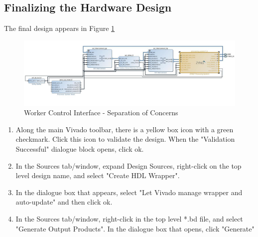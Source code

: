 \documentclass[12pt]{article}
\begin{document}
\subsection{Finalizing the Hardware Design}
The final design appears in Figure \ref{fig:hardware_design}
\begin{figure}[H]
  \begin{center}
  \includegraphics[scale=0.5]{figures/hardware_design.jpeg}
  \caption{Worker Control Interface - Separation of Concerns}  \label{fig:hardware_design}
  \end{center}
\end{figure}													
\begin{enumerate}
\item Along the main Vivado toolbar, there is a yellow box icon with a green checkmark.  Click this icon to validate the design. When the "Validation Successful" dialogue block opens, click ok. 
\item In the Sources tab/window, expand Design Sources, right-click on the top level design name, and select "Create HDL Wrapper".
\item In the dialogue box that appears, select "Let Vivado manage wrapper and auto-update" and then click ok.
\item In the Sources tab/window, right-click in the top level *.bd file, and select "Generate Output Products".  In the dialogue box that opens, click "Generate"
\end{enumerate}
\end{document}
